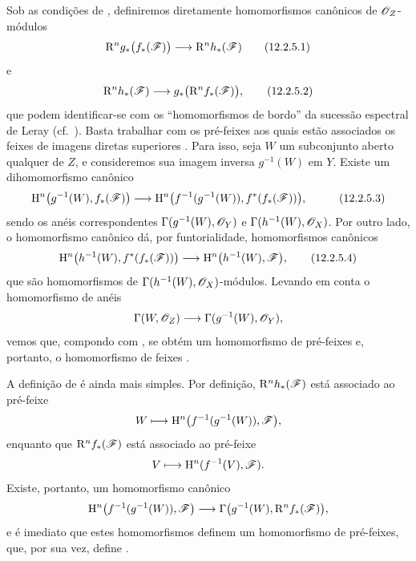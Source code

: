 \begin{env}[12.2.5]
\label{0.12.2.5}
Sob as condições de , definiremos diretamente
homomorfismos canônicos de $\mathscr{O}_Z$-módulos
\[
  \RR^n g_*\bigl(f_*(\sh{F})\bigr)
  \longrightarrow\RR^n h_*(\sh{F})
  \tag{12.2.5.1}
  \label{0.12.2.5.1}
\]
e
\[
  \RR^n h_*(\sh{F})
  \longrightarrow g_*\bigl(\RR^n f_*(\sh{F})\bigr),
  \tag{12.2.5.2}
  \label{0.12.2.5.2}
\]
que podem identificar-se com os ``homomorfismos de bordo'' da sucessão
espectral de Leray (cf.\ ).
Basta trabalhar com os pré-feixes aos quais estão associados os feixes de
imagens diretas superiores .
Para isso, seja $W$ um subconjunto aberto qualquer de $Z$, e consideremos
sua imagem inversa $g^{-1}(W)$ em $Y$.  Existe um
dihomomorfismo canônico
\[
  \begin{aligned}
  \HH^n\bigl(g^{-1}(W),f_*(\sh{F})\bigr)
  &\longrightarrow
  \HH^n\bigl(f^{-1}(g^{-1}(W)),
    f^*(f_*(\sh{F}))\bigr),
  \end{aligned}
  \tag{12.2.5.3}
  \label{0.12.2.5.3}
\]
sendo os anéis correspondentes
$\Gamma(g^{-1}(W),\mathscr{O}_Y)$ e
$\Gamma(h^{-1}(W),\mathscr{O}_X)$.
Por outro lado, o homomorfismo canônico
 dá, por funtorialidade,
homomorfismos canônicos
\[
  \HH^n\bigl(h^{-1}(W),f^*(f_*(\sh{F}))\bigr)
  \longrightarrow
  \HH^n\bigl(h^{-1}(W),\sh{F}\bigr),
  \tag{12.2.5.4}
  \label{0.12.2.5.4}
\]
que são homomorfismos de
$\Gamma(h^{-1}(W),\mathscr{O}_X)$-módulos.
Levando em conta o homomorfismo de anéis
\[
  \Gamma(W,\mathscr{O}_Z)
  \longrightarrow\Gamma(g^{-1}(W),\mathscr{O}_Y),
\]
vemos que, compondo  com
, se obtém um homomorfismo de pré-feixes e, portanto, o
homomorfismo de feixes .

A definição de  é ainda mais simples.
Por definição, $\mathrm{R}^n h_*(\mathscr{F})$ está associado ao pré-feixe
\[
  W\longmapsto
  \mathrm{H}^n\bigl(f^{-1}(g^{-1}(W)),\mathscr{F}\bigr),
\]
enquanto que $\mathrm{R}^n f_*(\mathscr{F})$ está associado ao pré-feixe
\[
  V\longmapsto\mathrm{H}^n(f^{-1}(V),\mathscr{F}).
\]
Existe, portanto, um homomorfismo canônico
\[
  \mathrm{H}^n\bigl(f^{-1}(g^{-1}(W)),\mathscr{F}\bigr)
  \longrightarrow
  \Gamma\bigl(g^{-1}(W),\mathrm{R}^n f_*(\mathscr{F})\bigr),
\]
e é imediato que estes homomorfismos definem um homomorfismo de
pré-feixes, que, por sua vez, define .
\end{env}

